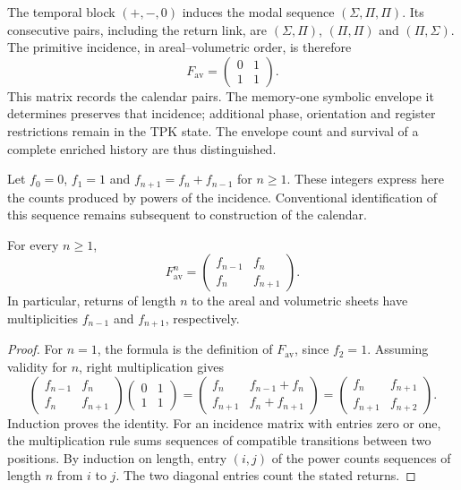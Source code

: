 The temporal block \((+,-,0)\) induces the modal sequence \((\Sigma,\Pi,\Pi)\). Its consecutive pairs, including the return link, are \((\Sigma,\Pi)\), \((\Pi,\Pi)\) and \((\Pi,\Sigma)\). The primitive incidence, in areal--volumetric order, is therefore
\begin{equation}
 F_{\mathrm{av}}=
 \begin{pmatrix}0&1\\1&1\end{pmatrix}.
 \label{hrr:incidencia-matriz}
\end{equation}
This matrix records the calendar pairs. The memory-one symbolic envelope it determines preserves that incidence; additional phase, orientation and register restrictions remain in the TPK state. The envelope count and survival of a complete enriched history are thus distinguished.

Let \(f_0=0\), \(f_1=1\) and \(f_{n+1}=f_n+f_{n-1}\) for \(n\geq1\). These integers express here the counts produced by powers of the incidence. Conventional identification of this sequence remains subsequent to construction of the calendar.

\begin{proposition}
\label{hrr:potencias}
For every \(n\geq1\),
\begin{equation}
 F_{\mathrm{av}}^n=
 \begin{pmatrix}f_{n-1}&f_n\\f_n&f_{n+1}\end{pmatrix}.
 \label{hrr:potencias-formula}
\end{equation}
In particular, returns of length \(n\) to the areal and volumetric sheets have multiplicities \(f_{n-1}\) and \(f_{n+1}\), respectively.
\end{proposition}
\begin{proof}
For \(n=1\), the formula is the definition of \(F_{\mathrm{av}}\), since \(f_2=1\). Assuming validity for \(n\), right multiplication gives
\[
 \begin{pmatrix}f_{n-1}&f_n\\f_n&f_{n+1}\end{pmatrix}
 \begin{pmatrix}0&1\\1&1\end{pmatrix}
 =\begin{pmatrix}f_n&f_{n-1}+f_n\\
 f_{n+1}&f_n+f_{n+1}\end{pmatrix}
 =\begin{pmatrix}f_n&f_{n+1}\\f_{n+1}&f_{n+2}\end{pmatrix}.
\]
Induction proves the identity. For an incidence matrix with entries zero or one, the multiplication rule sums sequences of compatible transitions between two positions. By induction on length, entry \((i,j)\) of the power counts sequences of length \(n\) from \(i\) to \(j\). The two diagonal entries count the stated returns.
\end{proof}

